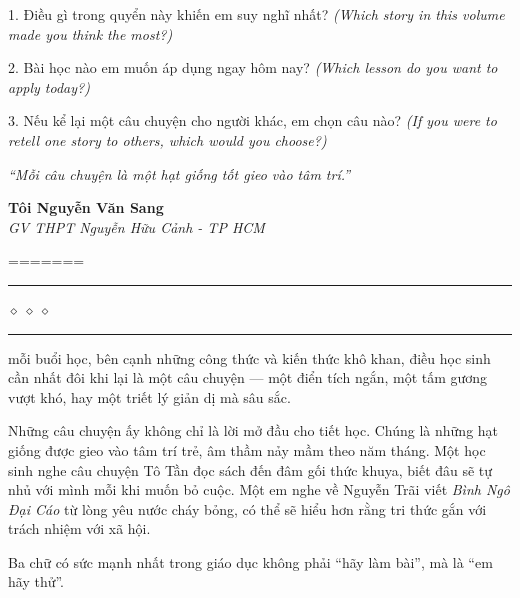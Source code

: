 \begin{tuhocnhanh}
1. Điều gì trong quyển này khiến em suy nghĩ nhất? \textit{(Which story in this volume made you think the most?)}

2. Bài học nào em muốn áp dụng ngay hôm nay? \textit{(Which lesson do you want to apply today?)}

3. Nếu kể lại một câu chuyện cho người khác, em chọn câu nào? \textit{(If you were to retell one story to others, which would you choose?)}
\end{tuhocnhanh}

\begin{center}
\textit{\color{truyengold}``Mỗi câu chuyện là một hạt giống tốt gieo vào tâm trí.''}
\end{center}

\begin{flushright}
\textbf{Tôi Nguyễn Văn Sang}\\
\textit{GV THPT Nguyễn Hữu Cảnh - TP HCM}
\end{flushright}

\ngancach
=======
\begin{center}
  {\color{truyengold}\rule{5cm}{1.5pt}\quad\large$\diamond\;\diamond\;\diamond$\quad\rule{5cm}{1.5pt}}
\end{center}

\vspace{0.5cm}

 mỗi buổi học, bên cạnh những công thức và kiến thức khô khan,
điều học sinh cần nhất đôi khi lại là một câu chuyện --- một điển tích ngắn,
một tấm gương vượt khó, hay một triết lý giản dị mà sâu sắc.

Những câu chuyện ấy không chỉ là lời mở đầu cho tiết học. Chúng là những hạt
giống được gieo vào tâm trí trẻ, âm thầm nảy mầm theo năm tháng. Một học sinh
nghe câu chuyện Tô Tần đọc sách đến đâm gối thức khuya, biết đâu sẽ tự nhủ với
mình mỗi khi muốn bỏ cuộc. Một em nghe về Nguyễn Trãi viết \textit{Bình Ngô Đại Cáo}
từ lòng yêu nước cháy bỏng, có thể sẽ hiểu hơn rằng tri thức gắn với trách
nhiệm với xã hội.

\vspace{0.4cm}

\begin{dangnon}
  Ba chữ có sức mạnh nhất trong giáo dục không phải ``hãy làm bài'', mà là
  ``em hãy thử''.
\end{dangnon}

\vspace{0.4cm}

